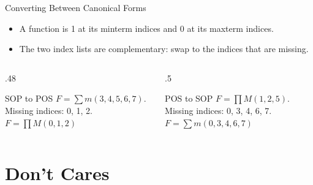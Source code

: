 \documentclass[9pt,aspectratio=169,xcolor=table]{beamer}
\begin{document}
\begin{frame}{Converting Between Canonical Forms}
  \begin{itemize}\small\itemsep3pt
    \item A function is 1 at its minterm indices and 0 at its maxterm indices.
    \item The two index lists are \alert{complementary}: swap to the indices that are missing.
  \end{itemize}
  \begin{columns}[t]
  \begin{column}{.48\textwidth}
    \begin{block}{SOP to POS}
      \small $F = \sum m(3,4,5,6,7)$. Missing indices: 0, 1, 2.\\
      $F = \prod M(0,1,2)$
    \end{block}
  \end{column}
  \begin{column}{.5\textwidth}
    \begin{block}{POS to SOP}
      \small $F = \prod M(1,2,5)$. Missing indices: 0, 3, 4, 6, 7.\\
      $F = \sum m(0,3,4,6,7)$
    \end{block}
  \end{column}
  \end{columns}
\end{frame}

\section{Don't Cares}
\end{document}
